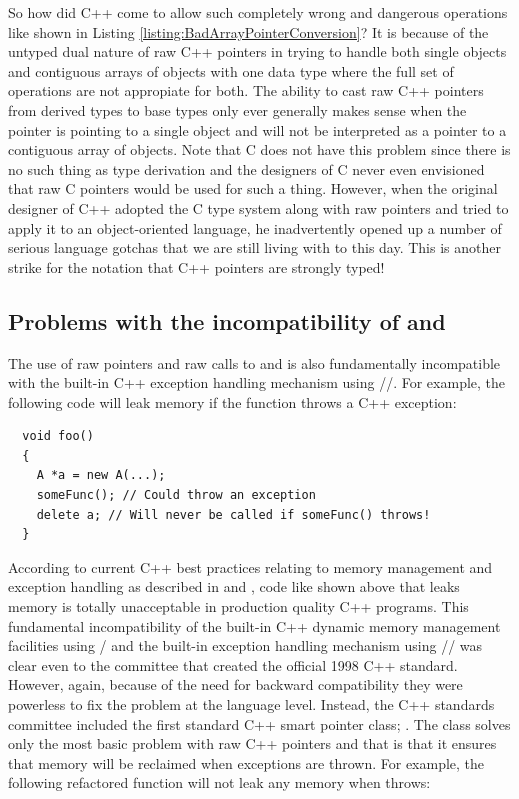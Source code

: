 \documentclass[pdf,ps2pdf,11pt]{SANDreport}
\begin{document}
So how did C++ come to allow such completely wrong and dangerous
operations like shown in Listing
{}\ref{listing:BadArrayPointerConversion}?  It is because of the
untyped dual nature of raw C++ pointers in trying to handle both
single objects and contiguous arrays of objects with one data type
where the full set of operations are not appropiate for both.  The
ability to cast raw C++ pointers from derived types to base types only
ever generally makes sense when the pointer is pointing to a single
object and will not be interpreted as a pointer to a contiguous array
of objects.  Note that C does not have this problem since there is no
such thing as type derivation and the designers of C never even
envisioned that raw C pointers would be used for such a thing.
However, when the original designer of C++ adopted the C type system
along with raw pointers and tried to apply it to an object-oriented
language, he inadvertently opened up a number of serious language
gotchas that we are still living with to this day.  This is another
strike for the notation that C++ pointers are strongly typed!


%
{}\subsection{Problems with the incompatibility of
{} and {}}
%

The use of raw pointers and raw calls to {} and
{} is also fundamentally incompatible with the built-in
C++ exception handling mechanism using
{}/{}/{}.  For example, the following
code will leak memory if the function {} throws a C++
exception:

{\small\begin{verbatim}
  void foo()
  {
    A *a = new A(...);
    someFunc(); // Could throw an exception
    delete a; // Will never be called if someFunc() throws!
  }
\end{verbatim}}

According to current C++ best practices relating to memory management
and exception handling as described in {}\cite[Item
{}29]{EffectiveC++ThirdEdition} and {}\cite[Item
{}71]{C++CodingStandards05}, code like shown above that leaks memory
is totally unacceptable in production quality C++ programs.  This
fundamental incompatibility of the built-in C++ dynamic memory
management facilities using {}/ and the built-in
exception handling mechanism using
{}/{}/ was clear even to the committee
that created the official 1998 C++ standard.  However, again, because
of the need for backward compatibility they were powerless to fix the
problem at the language level.  Instead, the C++ standards committee
included the first standard C++ smart pointer class;
{}.  The class {} solves only the most
basic problem with raw C++ pointers and that is that it ensures that
memory will be reclaimed when exceptions are thrown.  For example, the
following refactored function will not leak any memory when
{} throws:
\end{document}
